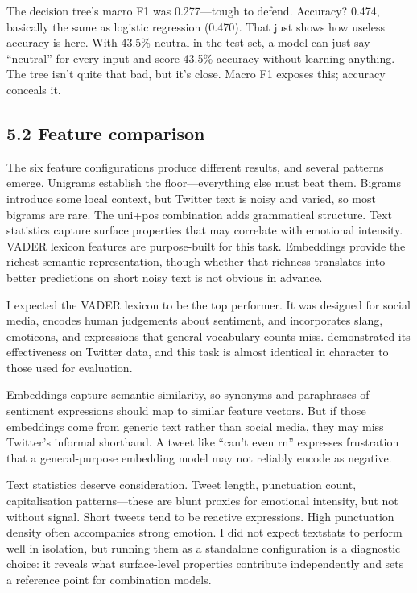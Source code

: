 \documentclass[12pt]{article}
\begin{document}
The decision tree's macro F1 was 0.277---tough to defend. Accuracy? 0.474, basically the same as logistic regression (0.470). That just shows how useless accuracy is here. With 43.5\% neutral in the test set, a model can just say ``neutral'' for every input and score 43.5\% accuracy without learning anything. The tree isn't quite that bad, but it's close. Macro F1 exposes this; accuracy conceals it.



\subsection*{5.2 Feature comparison}



The six feature configurations produce different results, and several patterns emerge. Unigrams establish the floor---everything else must beat them. Bigrams introduce some local context, but Twitter text is noisy and varied, so most bigrams are rare. The uni+pos combination adds grammatical structure. Text statistics capture surface properties that may correlate with emotional intensity. VADER lexicon features are purpose-built for this task. Embeddings provide the richest semantic representation, though whether that richness translates into better predictions on short noisy text is not obvious in advance.

I expected the VADER lexicon to be the top performer. It was designed for social media, encodes human judgements about sentiment, and incorporates slang, emoticons, and expressions that general vocabulary counts miss. \citet{hutto2014vader} demonstrated its effectiveness on Twitter data, and this task is almost identical in character to those used for evaluation.

Embeddings capture semantic similarity, so synonyms and paraphrases of sentiment expressions should map to similar feature vectors. But if those embeddings come from generic text rather than social media, they may miss Twitter's informal shorthand. A tweet like ``can't even rn'' expresses frustration that a general-purpose embedding model may not reliably encode as negative.

Text statistics deserve consideration. Tweet length, punctuation count, capitalisation patterns---these are blunt proxies for emotional intensity, but not without signal. Short tweets tend to be reactive expressions. High punctuation density often accompanies strong emotion. I did not expect textstats to perform well in isolation, but running them as a standalone configuration is a diagnostic choice: it reveals what surface-level properties contribute independently and sets a reference point for combination models.
\end{document}
